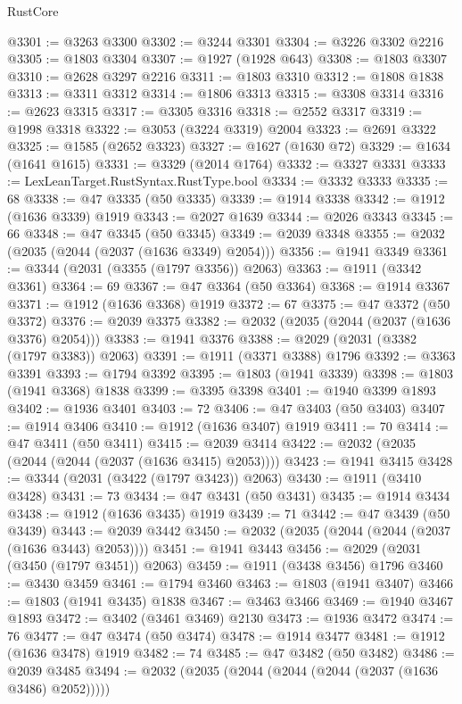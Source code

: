 \begin{lexlean}{RustCore}
\begin{coremodule}
@3301 := @3263 @3300
@3302 := @3244 @3301
@3304 := @3226 @3302 @2216
@3305 := @1803 @3304
@3307 := @1927 (@1928 @643)
@3308 := @1803 @3307
@3310 := @2628 @3297 @2216
@3311 := @1803 @3310
@3312 := @1808 @1838
@3313 := @3311 @3312
@3314 := @1806 @3313
@3315 := @3308 @3314
@3316 := @2623 @3315
@3317 := @3305 @3316
@3318 := @2552 @3317
@3319 := @1998 @3318
@3322 := @3053 (@3224 @3319) @2004
@3323 := @2691 @3322
@3325 := @1585 (@2652 @3323)
@3327 := @1627 (@1630 @72)
@3329 := @1634 (@1641 @1615)
@3331 := @3329 (@2014 @1764)
@3332 := @3327 @3331
@3333 := LexLeanTarget.RustSyntax.RustType.bool
@3334 := @3332 @3333
@3335 := 68
@3338 := @47 @3335 (@50 @3335)
@3339 := @1914 @3338
@3342 := @1912 (@1636 @3339) @1919
@3343 := @2027 @1639
@3344 := @2026 @3343
@3345 := 66
@3348 := @47 @3345 (@50 @3345)
@3349 := @2039 @3348
@3355 := @2032 (@2035 (@2044 (@2037 (@1636 @3349) @2054)))
@3356 := @1941 @3349
@3361 := @3344 (@2031 (@3355 (@1797 @3356)) @2063)
@3363 := @1911 (@3342 @3361)
@3364 := 69
@3367 := @47 @3364 (@50 @3364)
@3368 := @1914 @3367
@3371 := @1912 (@1636 @3368) @1919
@3372 := 67
@3375 := @47 @3372 (@50 @3372)
@3376 := @2039 @3375
@3382 := @2032 (@2035 (@2044 (@2037 (@1636 @3376) @2054)))
@3383 := @1941 @3376
@3388 := @2029 (@2031 (@3382 (@1797 @3383)) @2063)
@3391 := @1911 (@3371 @3388) @1796
@3392 := @3363 @3391
@3393 := @1794 @3392
@3395 := @1803 (@1941 @3339)
@3398 := @1803 (@1941 @3368) @1838
@3399 := @3395 @3398
@3401 := @1940 @3399 @1893
@3402 := @1936 @3401
@3403 := 72
@3406 := @47 @3403 (@50 @3403)
@3407 := @1914 @3406
@3410 := @1912 (@1636 @3407) @1919
@3411 := 70
@3414 := @47 @3411 (@50 @3411)
@3415 := @2039 @3414
@3422 := @2032 (@2035 (@2044 (@2044 (@2037 (@1636 @3415) @2053))))
@3423 := @1941 @3415
@3428 := @3344 (@2031 (@3422 (@1797 @3423)) @2063)
@3430 := @1911 (@3410 @3428)
@3431 := 73
@3434 := @47 @3431 (@50 @3431)
@3435 := @1914 @3434
@3438 := @1912 (@1636 @3435) @1919
@3439 := 71
@3442 := @47 @3439 (@50 @3439)
@3443 := @2039 @3442
@3450 := @2032 (@2035 (@2044 (@2044 (@2037 (@1636 @3443) @2053))))
@3451 := @1941 @3443
@3456 := @2029 (@2031 (@3450 (@1797 @3451)) @2063)
@3459 := @1911 (@3438 @3456) @1796
@3460 := @3430 @3459
@3461 := @1794 @3460
@3463 := @1803 (@1941 @3407)
@3466 := @1803 (@1941 @3435) @1838
@3467 := @3463 @3466
@3469 := @1940 @3467 @1893
@3472 := @3402 (@3461 @3469) @2130
@3473 := @1936 @3472
@3474 := 76
@3477 := @47 @3474 (@50 @3474)
@3478 := @1914 @3477
@3481 := @1912 (@1636 @3478) @1919
@3482 := 74
@3485 := @47 @3482 (@50 @3482)
@3486 := @2039 @3485
@3494 := @2032 (@2035 (@2044 (@2044 (@2044 (@2037 (@1636 @3486) @2052)))))

\end{coremodule}
\end{lexlean}
